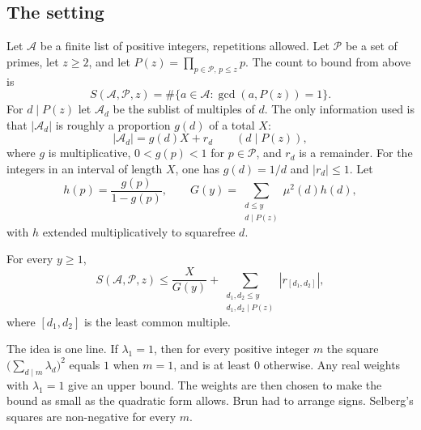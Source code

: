 \subsection*{The setting}

Let $\mathcal A$ be a finite list of positive integers, repetitions allowed. Let $\mathcal P$ be a set of primes, let $z\ge2$, and let $P(z)=\prod_{p\in\mathcal P,\,p\le z}p$. The count to bound from above is
\[
S(\mathcal A,\mathcal P,z)=\#\{a\in\mathcal A:\gcd(a,P(z))=1\}.
\]
For $d\mid P(z)$ let $\mathcal A_d$ be the sublist of multiples of $d$. The only information used is that $|\mathcal A_d|$ is roughly a proportion $g(d)$ of a total $X$:
\[
|\mathcal A_d|=g(d)X+r_d\qquad(d\mid P(z)),
\]
where $g$ is multiplicative, $0<g(p)<1$ for $p\in\mathcal P$, and $r_d$ is a remainder. For the integers in an interval of length $X$, one has $g(d)=1/d$ and $|r_d|\le1$. Let
\[
h(p)=\frac{g(p)}{1-g(p)},\qquad G(y)=\sum_{\substack{d\le y\\d\mid P(z)}}\mu^2(d)h(d),
\]
with $h$ extended multiplicatively to squarefree $d$.

\begin{theorem}[Selberg, 1947]\label{thm:selberg}
For every $y\ge1$,
\[
S(\mathcal A,\mathcal P,z)\le\frac X{G(y)}+\sum_{\substack{d_1,d_2\le y\\d_1,d_2\mid P(z)}}|r_{[d_1,d_2]}|,
\]
where $[d_1,d_2]$ is the least common multiple.
\end{theorem}

The idea is one line. If $\lambda_1=1$, then for every positive integer $m$ the square $\bigl(\sum_{d\mid m}\lambda_d\bigr)^2$ equals $1$ when $m=1$, and is at least $0$ otherwise. Any real weights with $\lambda_1=1$ give an upper bound. The weights are then chosen to make the bound as small as the quadratic form allows. Brun had to arrange signs. Selberg's squares are non-negative for every $m$.

